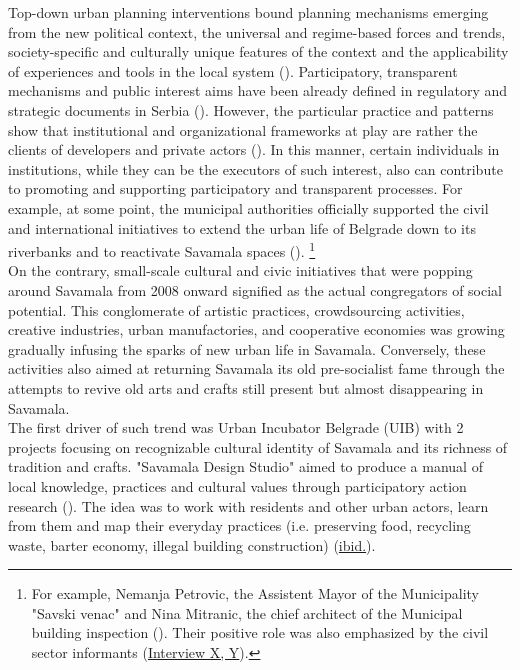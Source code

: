 \documentclass[11pt]{report}
\begin{document}
Top-down urban planning interventions bound planning mechanisms emerging from the new political context, the universal and regime-based forces and trends, society-specific and culturally unique features of the context and the applicability of experiences and tools in the local system (\cite{Nedovic-Budic2001}).
Participatory, transparent mechanisms and public interest aims have been already defined in regulatory and strategic documents in Serbia (\cite{VujosevicANDMaricic2012}).
However, the particular practice and patterns show that institutional and organizational frameworks at play are rather the clients of developers and private actors (\cite{MrdjenovicEtAl.2015}).
In this manner, certain individuals in institutions, while they can be the executors of such interest, also can contribute to promoting and supporting participatory and transparent processes.
For example, at some point, the municipal authorities officially supported the civil and international initiatives to extend the urban life of Belgrade down to its riverbanks and to reactivate Savamala spaces (\cite{VanistaLazarevic2015}).
\footnote{For example, Nemanja Petrovic, the Assistent Mayor of the Municipality "Savski venac" and Nina Mitranic, the chief architect of the Municipal building inspection (\cite{VanistaLazarevic2015}). Their positive role was also emphasized by the civil sector informants (\href{InterviewX}{Interview X, Y}).}
\\

On the contrary, small-scale cultural and civic initiatives that were popping around Savamala from 2008 onward signified as the actual congregators of social potential.
This conglomerate of artistic practices, crowdsourcing activities, creative industries, urban manufactories, and cooperative economies was growing gradually infusing the sparks of new urban life in Savamala.
Conversely, these activities also aimed at returning Savamala its old pre-socialist fame through the attempts to revive old arts and crafts still present but almost disappearing in Savamala.
\\

The first driver of such trend was Urban Incubator Belgrade (UIB) with 2 projects focusing on recognizable cultural identity of Savamala and its richness of tradition and crafts.
"Savamala Design Studio" aimed to produce a manual of local knowledge, practices and cultural values through participatory action research (\href{Cvetinovic}{\cite{CvetinovicEtAl.2013}}).
The idea was to work with residents and other urban actors, learn from them and map their everyday practices (i.e. preserving food, recycling waste, barter economy, illegal building construction) (\href{Cvetinovic}{ibid.}).
\\
\end{document}
